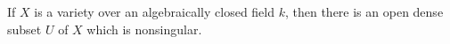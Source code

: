 If $X$ is a variety over an algebraically closed field $k$, then there is an open dense subset $U$ of $X$ which is nonsingular.
